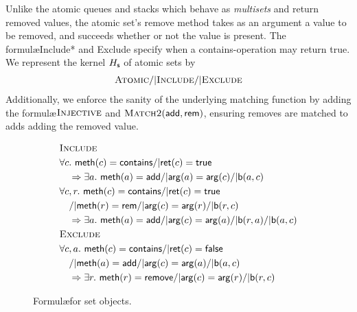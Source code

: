 \begin{example}

  Unlike the atomic queues and stacks which behave as \emph{multisets} and
  return removed values, the atomic set's {\sf remove} method takes as an
  argument a value to be removed, and succeeds whether or not the value is
  present. The formul\ae {\sc Include*} and {\sc Exclude} specify when a {\sf
  contains}-operation may return {\sf true}. We represent the kernel $H_{\sf s}$
  of atomic sets by  
  \begin{align*}
    \textsc{Atomic} /| \textsc{Include} /| \textsc{Exclude}
  \end{align*}
  Additionally, we enforce the sanity of the underlying matching function by
  adding the formul\ae $\textsc{Injective}$ and $\textsc{Match2}({\sf add},{\sf
  rem})$, ensuring removes are matched to adds adding the removed value.

\end{example}

\begin{figure}
  \footnotesize
  \begin{align*}
    & \textsc{Include} \\
    & \forall c.\ {\sf meth}(c) = {\sf contains} /| {\sf ret}(c) = {\sf true} \\
    & \quad => \exists a.\ {\sf meth}(a) = {\sf add} /| {\sf arg}(a) = {\sf arg}(c) /| {\sf b}(a,c) \\
    & \forall c,r.\ {\sf meth}(c)={\sf contains} /| {\sf ret}(c) = {\sf true} \\
    & \quad /| {\sf meth}(r) = {\sf rem}/| {\sf arg}(c) = {\sf arg}(r) /| {\sf b}(r,c) \\
    & \quad => \exists a.\ {\sf meth}(a) = {\sf add}/|{\sf arg}(c) = {\sf arg}(a) /| {\sf b}(r,a) /| {\sf b}(a,c)
    \\
    & \textsc{Exclude} \\
    & \forall c,a.\ {\sf meth}(c)={\sf contains} /| {\sf ret}(c) = {\sf false} \\
    & \quad /| {\sf meth}(a) = {\sf add}/| {\sf arg}(c) = {\sf arg}(a) /| {\sf b}(a,c) \\
    & \quad => \exists r.\ {\sf meth}(r)={\sf remove} /| {\sf arg}(c) = {\sf arg}(r) /| {\sf b}(r,c)
  \end{align*}
  \caption{Formul\ae for set objects.}
  \label{fig:formulas:set}
\end{figure}

